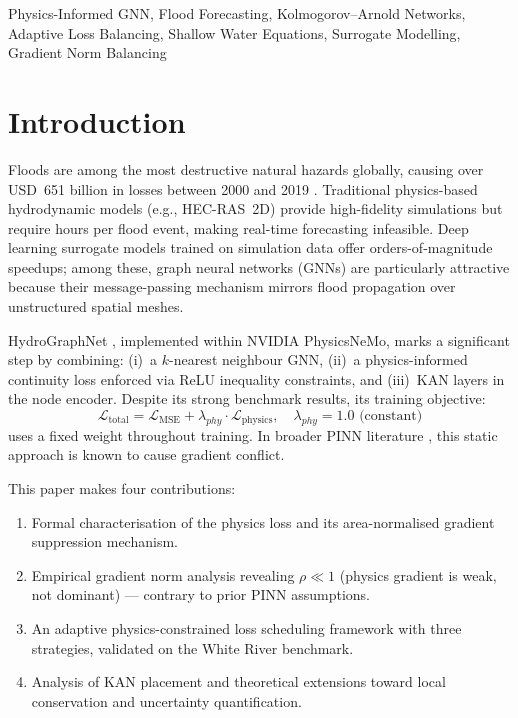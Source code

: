 \documentclass[conference]{IEEEtran}
\begin{document}
\begin{IEEEkeywords}
Physics-Informed GNN, Flood Forecasting, Kolmogorov--Arnold Networks,
Adaptive Loss Balancing, Shallow Water Equations, Surrogate Modelling,
Gradient Norm Balancing
\end{IEEEkeywords}

\section{Introduction}
\label{sec:intro}

Floods are among the most destructive natural hazards globally, causing
over USD~651 billion in losses between 2000 and 2019 \cite{undrr2020}.
Traditional physics-based hydrodynamic models (e.g., HEC-RAS~2D) provide
high-fidelity simulations but require hours per flood event, making
real-time forecasting infeasible. Deep learning surrogate models trained on
simulation data offer orders-of-magnitude speedups; among these, graph
neural networks (GNNs) are particularly attractive because their
message-passing mechanism mirrors flood propagation over unstructured
spatial meshes.

HydroGraphNet \cite{taghizadeh2025}, implemented within NVIDIA
PhysicsNeMo, marks a significant step by combining: (i)~a $k$-nearest
neighbour GNN, (ii)~a physics-informed continuity loss enforced via ReLU
inequality constraints, and (iii)~KAN layers \cite{liu2024kan} in the node
encoder. Despite its strong benchmark results, its training objective:
\begin{equation}
  \mathcal{L}_{\text{total}} = \mathcal{L}_{\text{MSE}} +
  \lambda_{phy} \cdot \mathcal{L}_{\text{physics}}, \quad
  \lambda_{phy} = 1.0 \text{ (constant)}
  \label{eq:loss_static}
\end{equation}
uses a fixed weight throughout training. In broader PINN literature
\cite{wang2021}, this static approach is known to cause gradient conflict.

This paper makes four contributions:
\begin{enumerate}
  \item Formal characterisation of the physics loss and its area-normalised
        gradient suppression mechanism.
  \item Empirical gradient norm analysis revealing $\rho \ll 1$ (physics
        gradient is weak, not dominant) — contrary to prior PINN
        assumptions.
  \item An adaptive physics-constrained loss scheduling framework with
        three strategies, validated on the White River benchmark.
  \item Analysis of KAN placement and theoretical extensions toward local
        conservation and uncertainty quantification.
\end{enumerate}
\end{document}
